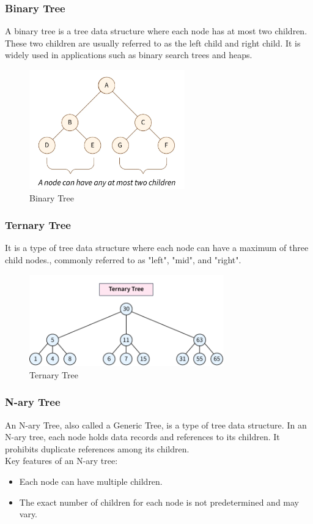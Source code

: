 \subsubsection{Binary Tree}
A binary tree is a tree data structure where each node has at most two children. These two children are usually referred to as the left child and right child. It is widely used in applications such as binary search trees and heaps.

\begin{figure}[H]
	\centering
	\includegraphics[width=0.6\textwidth]{figures/binary-tree}
	\caption{Binary Tree}
	\label{fig:bitree}
\end{figure}

\subsubsection{Ternary Tree}
It is a type of tree data structure where each node can have a maximum of three child nodes., commonly referred to as "left", "mid", and "right".
\begin{figure}[H]
	\centering
	\includegraphics[width=0.75\textwidth]{figures/ternary-tree}
	\caption{Ternary Tree}
	\label{fig:tertree}
\end{figure}

\subsubsection{N-ary Tree}
An N-ary Tree, also called a Generic Tree, is a type of tree data structure. In an N-ary tree, each node holds data records and references to its children. It prohibits duplicate references among its children. \\
Key features of an N-ary tree:\\
\begin{itemize}
	\item Each node can have multiple children.
	\item The exact number of children for each node is not predetermined and may vary.
\end{itemize}

